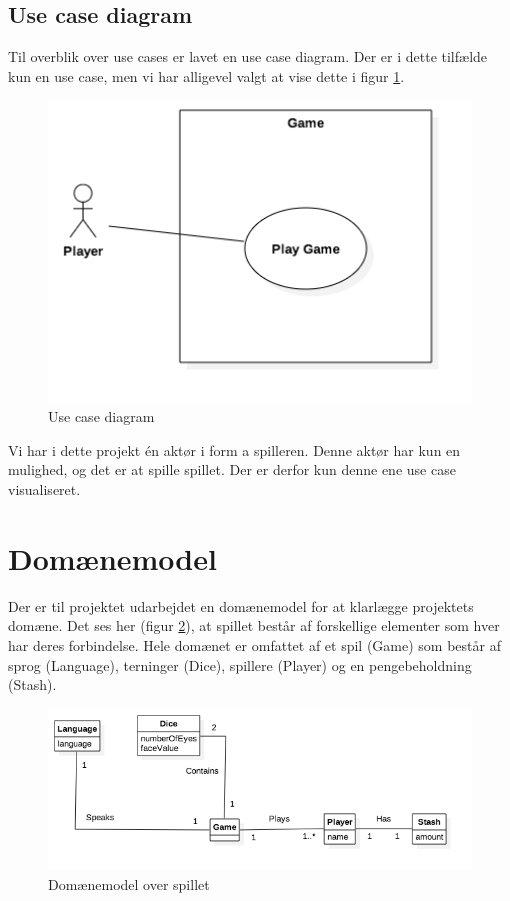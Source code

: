 \pagebreak

\subsection{Use case diagram}

Til overblik over use cases er lavet en use case diagram.
Der er i dette tilfælde kun en use case, men vi har alligevel valgt at vise dette i figur \ref{fig:use_case_diagram}.\\

\begin{figure}[H]
    \begin{center}
        \includegraphics[width=15cm]{graphics/Use_Case_Diagram.png}
        \caption{Use case diagram}
        \label{fig:use_case_diagram}
    \end{center}
\end{figure}

\noindent Vi har i dette projekt én aktør i form a spilleren.
Denne aktør har kun en mulighed, og det er at spille spillet.
Der er derfor kun denne ene use case visualiseret.

\pagebreak

\section{Domænemodel}

Der er til projektet udarbejdet en domænemodel for at klarlægge projektets domæne.
Det ses her (figur \ref{fig:domaenemodel}), at spillet består af forskellige elementer som hver har deres forbindelse.
Hele domænet er omfattet af et spil (Game) som består af sprog (Language), terninger (Dice), spillere (Player) og en pengebeholdning (Stash).\\


\begin{figure}[H]
    \begin{center}
        \includegraphics[width=15cm]{graphics/Domainmodel.png}
        \caption{Domænemodel over spillet}
        \label{fig:domaenemodel}
    \end{center}
\end{figure}
